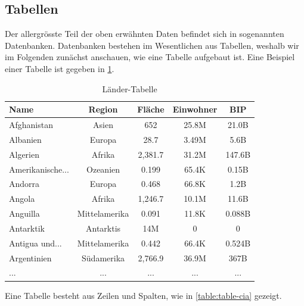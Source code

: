\subsection{Tabellen}
\label{subsec:tables}
Der allergrösste Teil der oben erwähnten Daten befindet sich in sogenannten Datenbanken. Datenbanken bestehen im Wesentlichen aus Tabellen, weshalb wir im Folgenden zunächst anschauen, wie eine Tabelle aufgebaut ist. Eine Beispiel einer Tabelle ist gegeben in \cref{table:cia-values}.

\begin{table}[H]
  \centering
  \begin{tabular}{lcccc}
    \toprule
    \textbf{Name}    & \textbf{Region} & \textbf{Fläche} & \textbf{Einwohner} & \textbf{BIP} \\
    \midrule
    Afghanistan      & Asien           & 652             & 25.8M              & 21.0B        \\
    Albanien         & Europa          & 28.7            & 3.49M              & 5.6B         \\
    Algerien         & Afrika          & 2,381.7         & 31.2M              & 147.6B       \\
    Amerikanische... & Ozeanien        & 0.199           & 65.4K              & 0.15B        \\
    Andorra          & Europa          & 0.468           & 66.8K              & 1.2B         \\
    Angola           & Afrika          & 1,246.7         & 10.1M              & 11.6B        \\
    Anguilla         & Mittelamerika   & 0.091           & 11.8K              & 0.088B       \\
    Antarktik        & Antarktis       & 14M             & 0                  & 0            \\
    Antigua und...   & Mittelamerika   & 0.442           & 66.4K              & 0.524B       \\
    Argentinien      & Südamerika      & 2,766.9         & 36.9M              & 367B         \\
    \midrule
    ...              & ...             & ...             & ...                & ...          \\
    \bottomrule
  \end{tabular}
  \caption{Länder-Tabelle}
  \label{table:cia-values}
\end{table}

Eine Tabelle besteht aus Zeilen und Spalten, wie in \cref{table:table-cia} gezeigt.


